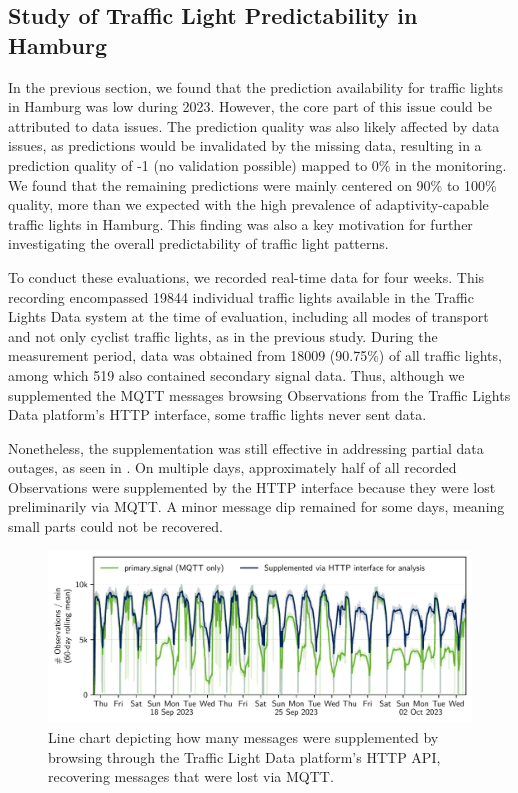 \subsection{Study of Traffic Light Predictability in Hamburg}

In the previous section, we found that the prediction availability for traffic lights in Hamburg was low during 2023. However, the core part of this issue could be attributed to data issues. The prediction quality was also likely affected by data issues, as predictions would be invalidated by the missing data, resulting in a prediction quality of -1 (no validation possible) mapped to 0\% in the monitoring. We found that the remaining predictions were mainly centered on 90\% to 100\% quality, more than we expected with the high prevalence of adaptivity-capable traffic lights in Hamburg. This finding was also a key motivation for further investigating the overall predictability of traffic light patterns. 

To conduct these evaluations, we recorded real-time data for four weeks. This recording encompassed 19844 individual traffic lights available in the Traffic Lights Data system at the time of evaluation, including all modes of transport and not only cyclist traffic lights, as in the previous study. During the measurement period, data was obtained from 18009 (90.75\%) of all traffic lights, among which 519 also contained secondary signal data. Thus, although we supplemented the MQTT messages browsing Observations from the Traffic Lights Data platform's HTTP interface, some traffic lights never sent data.

Nonetheless, the supplementation was still effective in addressing partial data outages, as seen in . On multiple days, approximately half of all recorded Observations were supplemented by the HTTP interface because they were lost preliminarily via MQTT. A minor message dip remained for some days, meaning small parts could not be recovered.


\begin{figure}[t]
    \centering
    \includegraphics[width=\linewidth]{images/adaptiveness-mqtt-http.pdf}
    \caption{Line chart depicting how many messages were supplemented by browsing through the Traffic Light Data platform's HTTP API, recovering messages that were lost via MQTT.}\label{fig:adaptiveness-mqtt-http}
\end{figure}


